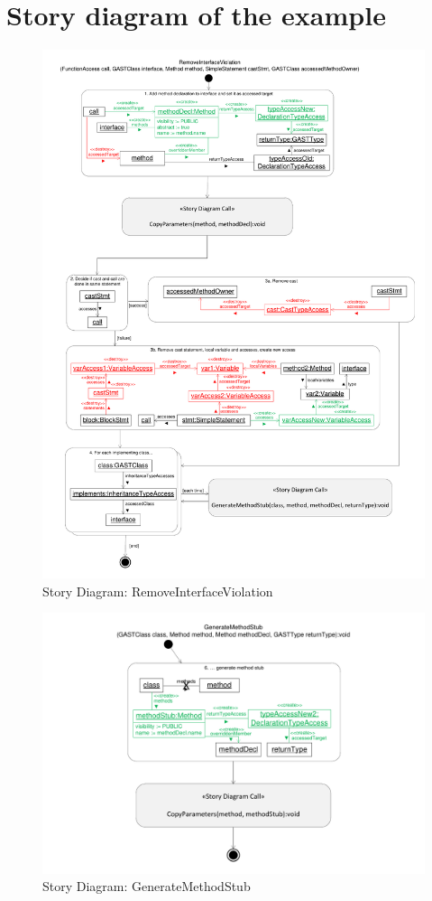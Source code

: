 \section{Story diagram of the example}

\begin{figure}[hbtp]
\centering
\includegraphics[width=\linewidth]{./figures/SDRemoveInterfaceViolation}
\caption{Story Diagram: RemoveInterfaceViolation}
\label{fig:SDRemoveInterfaceViolation}
\end{figure}

\begin{figure}[hbtp]
\centering
\includegraphics[width=\linewidth]{./figures/SDGenerateMethodStub}
\caption{Story Diagram: GenerateMethodStub}
\label{fig:SDGenerateMethodStub}
\end{figure}

